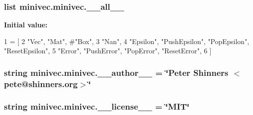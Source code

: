\subsubsection[{\+\_\+\+\_\+all\+\_\+\+\_\+}]{\setlength{\rightskip}{0pt plus 5cm}list minivec.\+minivec.\+\_\+\+\_\+all\+\_\+\+\_\+}\label{namespaceminivec_1_1minivec_aee6940c00f81893fa47f68748cb8baa7}
{\bfseries Initial value\+:}
\begin{DoxyCode}
1 = [
2     \textcolor{stringliteral}{"Vec"}, \textcolor{stringliteral}{"Mat"}, \textcolor{comment}{#"Box",}
3     \textcolor{stringliteral}{"Nan"},
4     \textcolor{stringliteral}{"Epsilon"}, \textcolor{stringliteral}{"PushEpsilon"}, \textcolor{stringliteral}{"PopEpsilon"}, \textcolor{stringliteral}{"ResetEpsilon"},
5     \textcolor{stringliteral}{"Error"}, \textcolor{stringliteral}{"PushError"}, \textcolor{stringliteral}{"PopError"}, \textcolor{stringliteral}{"ResetError"},
6 ]
\end{DoxyCode}
\hypertarget{namespaceminivec_1_1minivec_ab8c40fffebf0c6ede3ef55861cfe4926}{}
\subsubsection[{\+\_\+\+\_\+author\+\_\+\+\_\+}]{\setlength{\rightskip}{0pt plus 5cm}string minivec.\+minivec.\+\_\+\+\_\+author\+\_\+\+\_\+ = \char`\"{}Peter Shinners $<$pete@shinners.\+org$>$\char`\"{}}\label{namespaceminivec_1_1minivec_ab8c40fffebf0c6ede3ef55861cfe4926}
\hypertarget{namespaceminivec_1_1minivec_a02847a23f8377584f9fb1f81c88e4dd0}{}
\subsubsection[{\+\_\+\+\_\+license\+\_\+\+\_\+}]{\setlength{\rightskip}{0pt plus 5cm}string minivec.\+minivec.\+\_\+\+\_\+license\+\_\+\+\_\+ = \char`\"{}M\+I\+T\char`\"{}}\label{namespaceminivec_1_1minivec_a02847a23f8377584f9fb1f81c88e4dd0}
\hypertarget{namespaceminivec_1_1minivec_a42d6bb912b5c046963cac5e9e34bc9be}{}
